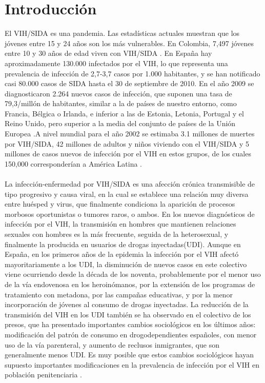 \documentclass[a4paper,twocolumn,10pt]{article}
\begin{document}
\section{Introducción}
El VIH/SIDA es una pandemia. Las estadísticas actuales muestran que los jóvenes entre 15 y 24 años son los más vulnerables. En Colombia, 7,497 jóvenes entre 10 y 30 años de edad viven con VIH/SIDA \cite{LinaMariaVera2004}. En España hay aproximadamente 130.000 infectados por el VIH, lo que representa una prevalencia de infección de 2,7-3,7 casos por 1.000 habitantes, y se han notificado casi 80.000 casos de SIDA hasta el 30 de septiembre de 2010. En el año 2009 se diagnosticaron 2.264 nuevos casos de infección, que suponen una tasa de 79,3/millón de habitantes, similar a la de países de nuestro entorno, como Francia, Bélgica o Irlanda, e inferior a las de Estonia, Letonia, Portugal y el Reino Unido, pero superior a la media del conjunto de países de la Unión Europea \cite{Marco2012}.A nivel mundial para el año 2002 se estimaba 3.1 millones de muertes por VIH/SIDA, 42 millones de adultos y niños viviendo con el VIH/SIDA y 5 millones de casos nuevos de infección por el VIH en estos grupos, de los cuales 150,000 corresponderían a América Latina \cite{LinaMariaVera2004}. \\ \\
La infección-enfermedad por VIH/SIDA es una afección crónica transmisible de tipo progresivo y causa viral, en la cual se establece una relación muy diversa entre huésped y virus, que finalmente condiciona la aparición de procesos morbosos oportunistas o tumores raros, o ambos\cite{Castillo2004}. En los nuevos diagnósticos de infección por el VIH, la transmisión en hombres que mantienen relaciones sexuales con hombres es la más frecuente, seguida de la heterosexual, y finalmente la producida en usuarios de drogas inyectadas(UDI). Aunque en España, en los primeros años de la epidemia la infección por el VIH afectó mayoritariamente a los UDI, la disminución de nuevos casos en este colectivo viene ocurriendo desde la década de los noventa, probablemente por el menor uso de la vía endovenosa en los heroinómanos, por la extensión de los programas de tratamiento con metadona, por las campañas educativas, y por la menor incorporación de jóvenes al consumo de drogas inyectadas. La reducción de la transmisión del VIH en los UDI también se ha observado en el colectivo de los presos, que ha presentado importantes cambios sociológicos en los últimos años: modificación del patrón de consumo en drogodependientes españoles, con menor uso de la vía parenteral, y aumento de reclusos inmigrantes, que son generalmente menos UDI. Es muy posible que estos cambios sociológicos hayan supuesto importantes modificaciones en la prevalencia de infección por el VIH en población penitenciaria \cite{Marco2012}.
\end{document}
